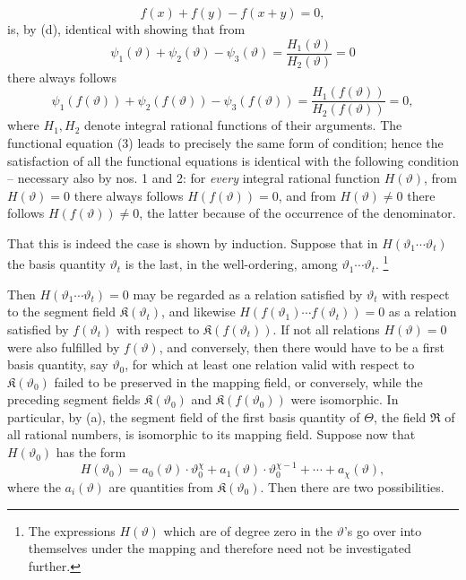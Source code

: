 \documentclass[11pt]{article}
\providecommand{\Kfield}{\mathfrak K}
\providecommand{\Rfield}{\mathfrak R}
\providecommand{\Kfield}{\mathfrak{K}}
\providecommand{\srcfn}[2]{%
  \begingroup
  \renewcommand{\thefootnote}{#1}%
  \footnote{#2}%
  \addtocounter{footnote}{-1}%
  \endgroup}
\begin{document}
\[
f(x)+f(y)-f(x+y)=0,
\]
is, by (d), identical with showing that from
\[
\psi_1(\vartheta)+\psi_2(\vartheta)-\psi_3(\vartheta)
 =\frac{H_1(\vartheta)}{H_2(\vartheta)}=0
\]
there always follows
\[
\psi_1(f(\vartheta))+\psi_2(f(\vartheta))-\psi_3(f(\vartheta))
 =\frac{H_1(f(\vartheta))}{H_2(f(\vartheta))}=0,
\]
where \(H_1,H_2\) denote integral rational functions of their arguments. The functional equation (3) leads to precisely the same form of condition; hence the satisfaction of all the functional equations is identical with the following condition -- necessary also by nos. 1 and 2: for \emph{every} integral rational function \(H(\vartheta)\), from \(H(\vartheta)=0\) there always follows \(H(f(\vartheta))=0\), and from \(H(\vartheta)\ne0\) there follows \(H(f(\vartheta))\ne0\), the latter because of the occurrence of the denominator.

That this is indeed the case is shown by induction. Suppose that in \(H(\vartheta_1\cdots\vartheta_t)\) the basis quantity \(\vartheta_t\) is the last, in the well-ordering, among \(\vartheta_1\cdots\vartheta_t\).\srcfn{**)}{The expressions \(H(\vartheta)\) which are of degree zero in the \(\vartheta\)'s go over into themselves under the mapping and therefore need not be investigated further.} Then \(H(\vartheta_1\cdots\vartheta_t)=0\) may be regarded as a relation satisfied by \(\vartheta_t\) with respect to the segment field \(\Kfield(\vartheta_t)\), and likewise \(H(f(\vartheta_1)\cdots f(\vartheta_t))=0\) as a relation satisfied by \(f(\vartheta_t)\) with respect to \(\Kfield(f(\vartheta_t))\). If not all relations \(H(\vartheta)=0\) were also fulfilled by \(f(\vartheta)\), and conversely, then there would have to be a first basis quantity, say \(\vartheta_0\), for which at least one relation valid with respect to \(\Kfield(\vartheta_0)\) failed to be preserved in the mapping field, or conversely, while the preceding segment fields \(\Kfield(\vartheta_0)\) and \(\Kfield(f(\vartheta_0))\) were isomorphic. In particular, by (a), the segment field of the first basis quantity of \(\Theta\), the field \(\Rfield\) of all rational numbers, is isomorphic to its mapping field. Suppose now that \(H(\vartheta_0)\) has the form
\[
H(\vartheta_0)=a_0(\vartheta)\cdot\vartheta_0^\chi
+a_1(\vartheta)\cdot\vartheta_0^{\chi-1}+\cdots+a_\chi(\vartheta),
\]
where the \(a_i(\vartheta)\) are quantities from \(\Kfield(\vartheta_0)\). Then there are two possibilities.
\end{document}
